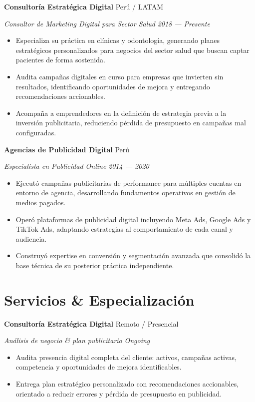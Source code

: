\documentclass[11pt,letterpaper]{article}
\newcommand{\entry}[4]{%
  \noindent\textbf{#1} \hfill #2 \par\nopagebreak
  \textit{#3} \hfill \textit{#4} \par\nopagebreak
}
\begin{document}
\entry{Consultoría Estratégica Digital}{Perú / LATAM}{Consultor de Marketing Digital para Sector Salud}{2018 --- Presente}
\begin{itemize}
  \item Especializa su práctica en clínicas y odontología, generando planes estratégicos personalizados para negocios del sector salud que buscan captar pacientes de forma sostenida.
  \item Audita campañas digitales en curso para empresas que invierten sin resultados, identificando oportunidades de mejora y entregando recomendaciones accionables.
  \item Acompaña a emprendedores en la definición de estrategia previa a la inversión publicitaria, reduciendo pérdida de presupuesto en campañas mal configuradas.
\end{itemize}
\vspace{0.3em}

\entry{Agencias de Publicidad Digital}{Perú}{Especialista en Publicidad Online}{2014 --- 2020}
\begin{itemize}
  \item Ejecutó campañas publicitarias de performance para múltiples cuentas en entorno de agencia, desarrollando fundamentos operativos en gestión de medios pagados.
  \item Operó plataformas de publicidad digital incluyendo Meta Ads, Google Ads y TikTok Ads, adaptando estrategias al comportamiento de cada canal y audiencia.
  \item Construyó expertise en conversión y segmentación avanzada que consolidó la base técnica de su posterior práctica independiente.
\end{itemize}
\vspace{0.3em}

\section{Servicios \& Especialización}

\entry{Consultoría Estratégica Digital}{Remoto / Presencial}{Análisis de negocio \& plan publicitario}{Ongoing}
\begin{itemize}
  \item Audita presencia digital completa del cliente: activos, campañas activas, competencia y oportunidades de mejora identificables.
  \item Entrega plan estratégico personalizado con recomendaciones accionables, orientado a reducir errores y pérdida de presupuesto en publicidad.
\end{itemize}
\vspace{0.3em}
\end{document}
